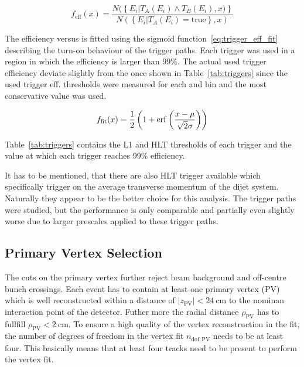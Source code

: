\begin{equation}
\label{eq:trigger_eff}
    f_{\mathrm{eff}} (x) = \frac{N(\left\{E_i|T_A(E_i) \wedge T_B(E_i), x)\right\}}{N(\left\{ E_i | T_A(E_i) = \mathrm{true} \right\} , x)}
\end{equation}

The efficiency versus \ptavg is fitted using the sigmoid function~\ref{eq:trigger_eff_fit} describing
the turn-on behaviour of the trigger paths. Each trigger was used in a region in which the efficiency
is larger than $99\%$. The actual used trigger efficiency deviate slightly from the once shown in Table~\ref{tab:triggers}
since the used trigger eff. thresholds were measured for each \ystar and \yboost bin and the most
conservative value was used.

\begin{equation}
\label{eq:trigger_eff_fit}
    f_{\mathrm{fit}} (x) = \frac{1}{2} \left( 1 + \operatorname{erf} \left(\frac{x-\mu}{\sqrt{2}\sigma}\right)\right)
\end{equation}

Table~\ref{tab:triggers} contains the L1 and HLT thresholds of each trigger and
the \ptavg value at which each trigger reaches 99\% efficiency.

It has to be mentioned, that there are also HLT trigger available which
specifically trigger on the average transverse momentum of the dijet system.
Naturally they appear to be the better choice for this analysis. The \ptavg
trigger paths were studied, but the performance is only comparable and partially
even slightly worse due to larger prescales applied to these trigger paths.

\subsection{Primary Vertex Selection}

The cuts on the primary vertex further reject beam background and off-centre bunch
crossings. Each event has to contain at least one primary vertex (PV) which is well
reconstructed within a distance of $|z_\mathrm{PV}| < \SI{24}{\centi \meter}$ to
the nominan interaction point of the detector. Futher more the radial distance
$\rho_\mathrm{PV}$ has to fullfill $\rho_\mathrm{PV} < \SI{2}{\centi\meter}$. To
ensure a high quality of the vertex reconstruction in the fit, the number of
degrees of freedom in the vertex fit $n_{\mathrm{dof,PV}}$ needs to be at least
four. This basically means that at least four tracks need to be present to
perform the vertex fit.

